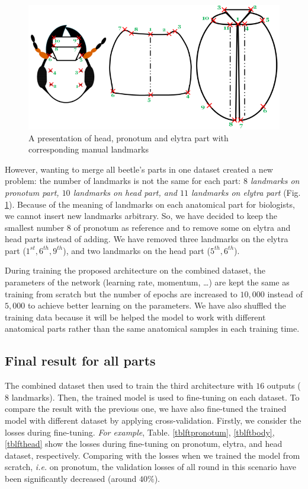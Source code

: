 \documentclass[review]{elsarticle}
\begin{document}
\begin{figure}[htbp]
	\centerline{\includegraphics[scale=0.4]{images/merge}}
	\caption{A presentation of head, pronotum and elytra part with
corresponding manual landmarks}
	\label{figmerge}
\end{figure}

However, wanting to merge all beetle's parts in one dataset created a new problem: the number of landmarks is not the same for each part: \textit{$8$ landmarks on pronotum part, $10$ landmarks on head part, and $11$ landmarks on elytra part} (Fig. \ref{figmerge}). Because of the meaning of landmarks on each anatomical part for biologists, we cannot insert new landmarks arbitrary. So, we have decided to keep the smallest number $8$ of pronotum as reference and to remove some on elytra and head parts instead of adding. We have removed three landmarks on the elytra part ($1^{st}, 6^{th}, 9^{th}$), and two landmarks on the head part ($5^{th}, 6^{th}$). 

During training the proposed architecture on the combined dataset, the parameters of the network (learning rate, momentum, \ldots) are kept the same as training from scratch but the number of epochs are increased to $10, 000$ instead of $5, 000$ to achieve better learning on the parameters. We have also shuffled the training data because it will be helped the model to work with different anatomical parts rather than the same anatomical samples in each training time.

\subsection{Final result for all parts}
The combined dataset then used to train the third architecture with $16$ outputs ($8$ landmarks). Then, the trained model is used to fine-tuning on each dataset. To compare the result with the previous one, we have also fine-tuned the trained model with different dataset by applying cross-validation. Firstly, we consider the losses during fine-tuning. \textit{For example}, Table. \ref{tblftpronotum}, \ref{tblftbody}, \ref{tblfthead} show the losses during fine-tuning on pronotum, elytra, and head dataset, respectively. Comparing with the losses when we trained the model from scratch, \textit{i.e.} on pronotum, the validation losses of all round in this scenario have been significantly decreased (around $40\%$).
\end{document}
